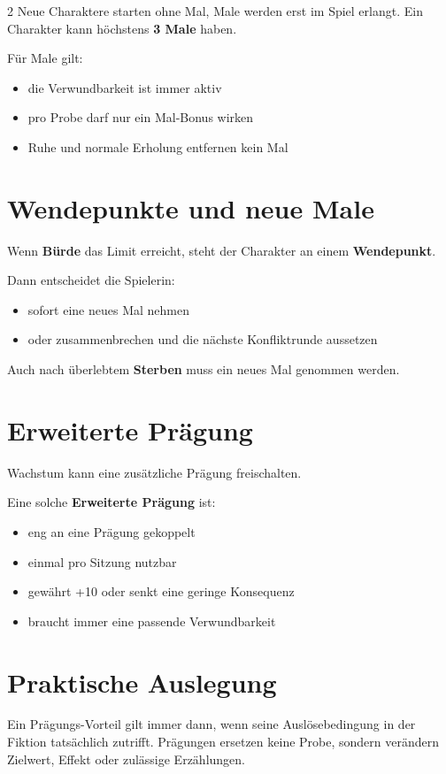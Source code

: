 \begin{multicols*}{2}
Neue Charaktere starten ohne Mal, Male werden erst im Spiel erlangt.
Ein Charakter kann höchstens \textbf{3 Male} haben.

Für Male gilt:
\begin{itemize}[leftmargin=*]
\item die Verwundbarkeit ist immer aktiv
\item pro Probe darf nur ein Mal-Bonus wirken
\item Ruhe und normale Erholung entfernen kein Mal
\end{itemize}

\section{Wendepunkte und neue Male}\label{sec:wendepunkte-und-neue-male}
Wenn \textbf{Bürde} das Limit erreicht, steht der Charakter an einem \textbf{Wendepunkt}.

Dann entscheidet die Spielerin:
\begin{itemize}[leftmargin=*]
\item sofort eine neues Mal nehmen
\item oder zusammenbrechen und die nächste Konfliktrunde aussetzen
\end{itemize}

Auch nach überlebtem \textbf{Sterben} muss ein neues Mal genommen werden.

\section{Erweiterte Prägung}\label{sec:erweiterte-pragung}
Wachstum kann eine zusätzliche Prägung freischalten.

Eine solche \textbf{Erweiterte Prägung} ist:
\begin{itemize}[leftmargin=*]
\item eng an eine Prägung gekoppelt
\item einmal pro Sitzung nutzbar
\item gewährt +10 oder senkt eine geringe Konsequenz
\item braucht immer eine passende Verwundbarkeit
\end{itemize}

\section{Praktische Auslegung}\label{sec:praktische-auslegung}
Ein Prägungs-Vorteil gilt immer dann, wenn seine Auslösebedingung in der Fiktion tatsächlich zutrifft.
Prägungen ersetzen keine Probe, sondern verändern Zielwert, Effekt oder zulässige Erzählungen.


\end{multicols*}
